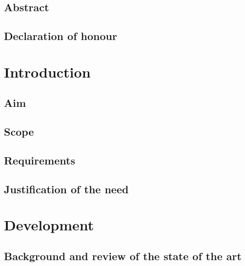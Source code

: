 \documentclass[11pt, a4paper, twoside]{book}
\begin{document}




\section*{Abstract}

\newpage

\section*{Declaration of honour}

\newpage


\tableofcontents
\listoffigures
\listoftables
\newpage




\chapter{Introduction}


\section{Aim}

\section{Scope}

\section{Requirements}

\section{Justification of the need}


\chapter{Development}

\section{Background and review of the state of the art}


\end{document}
